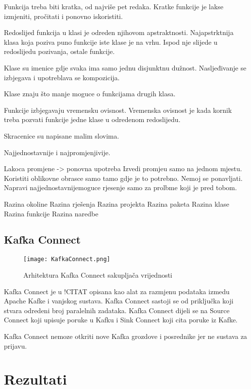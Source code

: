 \documentclass[times, utf8, diplomski, numeric]{fer}
\begin{document}
Funkcija treba biti kratka, od najviše pet redaka. Kratke funkcije je lakse izmjeniti, pročitati i ponovno iskoristiti.

Redoslijed funkcija u klasi je odreden njihovom apstraktnosti. Najapstrktnija klasa koja poziva puno funkcije iste klase je na vrhu. Ispod nje slijede u redoslijedu pozivanja, ostale funkcije.

Klase su imenice gdje svaka ima samo jednu disjunktnu dužnost. Nasljeđivanje se izbjegava i upotreblava se kompozicija.

Klase znaju što manje moguce o funkcijama drugih klasa.

Funkcije izbjegavaju vremensku ovisnost. Vremenska ovisnost je kada kornik treba pozvati funkcije jedne klase u odredenom redoslijedu.

Skracenice su napisane malim slovima.



Najjednostavnije i najpromjenjivije.

Lakoca promjene -> ponovna upotreba
Izvedi promjeu samo na jednom mjestu.
Koristiti oblikovne obrasce samo tamo gdje je to potrebno.
Nemoj se ponavljati.
Napravi najjednostavnijemoguce rjesenje samo za prolbme koji je pred tobom.

Razina okoline
Razina rješenja
Razina projekta
Razina paketa
Razina klase
Razina funkcije
Razina naredbe

\section{Kafka Connect}

\begin{figure}[H]
    \centering
    \texttt{[image: KafkaConnect.png]}
    \caption{Arhitektura Kafka Connect sakupljača vrijednosti}
    \label{fig:kafka-connect}
\end{figure}

Kafka Connect je u !CITAT opisana kao alat za razmjenu podataka izmedu Apache Kafke i vanjskog sustava. Kafka Connect sastoji se od priključka koji stvara odredeni broj paralelnih zadataka. Kafka Connect dijeli se na Source Connect koji upisuje poruke u Kafku i Sink Connect koji cita poruke iz Kafke.

Kafka Connect nemoze otkriti nove Kafka grozdove i posrednike jer ne sustava za prijavu.

\chapter{Rezultati}
\end{document}
